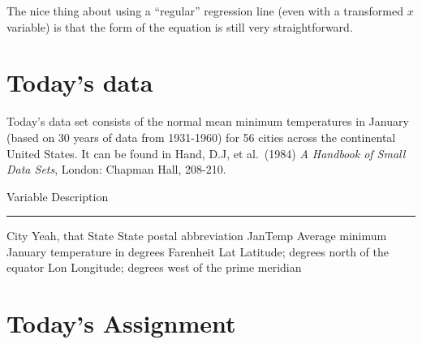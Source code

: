 \documentclass[
  letterpaper,
  DIV=11,
  numbers=noendperiod]{scrartcl}
\begin{document}
The nice thing about using a ``regular'' regression line (even with a
transformed \(x\) variable) is that the form of the equation is still
very straightforward.

\section{Today's data}\label{todays-data}

Today's data set consists of the normal mean minimum temperatures in
January (based on 30 years of data from 1931-1960) for 56 cities across
the continental United States. It can be found in Hand, D.J, et
al.~(1984) \emph{A Handbook of Small Data Sets}, London: Chapman Hall,
208-210.

Variable Description

\begin{center}\rule{0.5\linewidth}{0.5pt}\end{center}

City Yeah, that State State postal abbreviation JanTemp Average minimum
January temperature in degrees Farenheit Lat Latitude; degrees north of
the equator Lon Longitude; degrees west of the prime meridian

\section{Today's Assignment}\label{todays-assignment}
\end{document}

